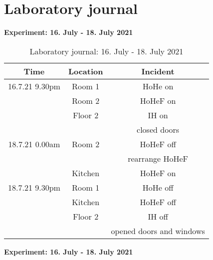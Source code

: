 \section{Laboratory journal}
\label{sec:appendix:Laborbuch}
\textbf{Experiment: 16. July - 18. July 2021}
\begin{table}[H]
    \centering
    \begin{tabular}{c|c|c}
        \textbf{Time} & \textbf{Location} & \textbf{Incident }\\
        \hline
        \hline
        16.7.21 9.30pm & Room 1 & HoHe on\\
        & Room 2 & HoHeF on\\
        & Floor 2 & IH on\\
        && closed doors\\
        \hline
        18.7.21 0.00am & Room 2 & HoHeF off\\ 
        && rearrange HoHeF \\
        & Kitchen & HoHeF on\\
        \hline
        18.7.21 9.30pm & Room 1 & HoHe off\\
        & Kitchen & HoHeF off\\
        & Floor 2 & IH off\\
        && opened doors and windows\\
    \end{tabular}
    \caption{Laboratory journal: 16. July - 18. July 2021}
    \label{tab:Experiment1app}
\end{table}
\textbf{Experiment: 16. July - 18. July 2021}
